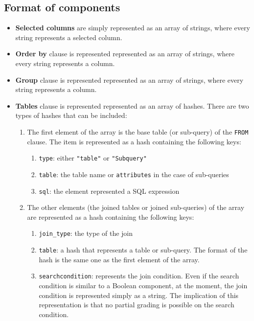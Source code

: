 \subsection{Format of components}

\begin{itemize}
    \item \textbf{Selected columns} are simply represented as an array of strings, where every string represents a selected column.
    \item \textbf{Order by} clause is represented represented as an array of strings, where every string represents a column.
    \item \textbf{Group} clause is represented represented as an array of strings, where every string represents a column.
    \item \textbf{Tables} clause is represented represented as an array of hashes. There are two types of hashes that can be included:
    \begin{enumerate}
        \item The first element of the array is the base table (or sub-query) of the \texttt{FROM} clause. The item is represented as a hash containing the following keys:
        \begin{enumerate}
            \item \texttt{type}: either \texttt{"table"} or \texttt{"Subquery"}
            \item \texttt{table}: the table name or \texttt{attributes} in the case of sub-queries
            \item \texttt{sql}: the element represented a SQL expression
        \end{enumerate}
        \item The other elements (the joined tables or joined sub-queries) of the array are represented as a hash containing the following keys:
        \begin{enumerate}
            \item \texttt{join_type}: the type of the join
            \item \texttt{table}: a hash that represents a table or sub-query. The format of the hash is the same one as the first element of the array.
            \item \texttt{searchcondition}: represents the join condition. Even if the search condition is similar to a Boolean component, at the moment, the join condition is represented simply as a string. The implication of this representation is that no partial grading is possible on the search condition.

\end{enumerate}
\end{enumerate}
\end{itemize}
